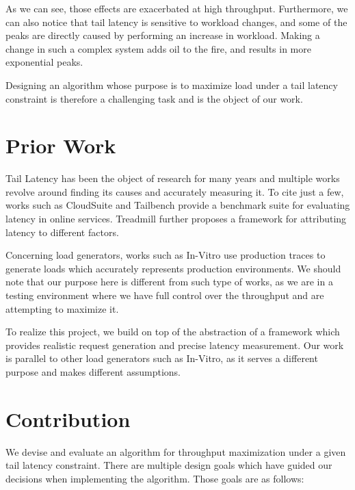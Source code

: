 \documentclass[10pt,conference,compsocconf]{IEEEtran}
\begin{document}
As we can see, those effects are exacerbated at high throughput.  Furthermore, we can also notice that tail latency is sensitive to workload changes, and some of the peaks are directly caused by performing an increase in workload. Making a change in such a complex system adds oil to the fire, and results in more exponential peaks. 

Designing an algorithm whose purpose is to maximize load under a tail latency constraint is therefore a challenging task and is the object of our work.

\section{Prior Work}\label{prior}

Tail Latency has been the object of research for many years and multiple works revolve around finding its causes and accurately measuring it. To cite just a few, works such as CloudSuite \cite{clouds} and Tailbench \cite{tailbench} provide a benchmark suite for evaluating latency in online services. Treadmill \cite{treadmill} further proposes a framework for attributing latency to different factors. 

Concerning load generators, works such as In-Vitro \cite{in-vitro} use production traces to generate loads which accurately represents production environments. We should note that our purpose here is different from such type of works, as we are in a testing environment where we have full control over the throughput and are attempting to maximize it. 

To realize this project, we build on top of the abstraction of a framework which provides realistic request generation and precise latency measurement. Our work is parallel to other load generators such as In-Vitro, as it serves a different purpose and makes different assumptions.

\section{Contribution}\label{contr}

We devise and evaluate an algorithm for throughput maximization under a given tail latency constraint. There are multiple design goals which have guided our decisions when implementing the algorithm. Those goals are as follows:
\end{document}
